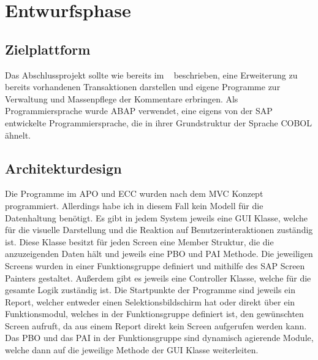 \section{Entwurfsphase} 
\label{sec:Entwurfsphase}

\subsection{Zielplattform}
\label{sec:Zielplattform}
Das Abschlussprojekt sollte wie bereits im ~ beschrieben, eine Erweiterung zu bereits vorhandenen Transaktionen darstellen und eigene Programme zur Verwaltung und Massenpflege der Kommentare erbringen. Als Programmiersprache wurde \ac{ABAP} verwendet, eine eigens von der SAP entwickelte Programmiersprache, die in ihrer Grundstruktur der Sprache COBOL ähnelt.

\subsection{Architekturdesign}
\label{sec:Architekturdesign}
Die Programme im \ac{APO} und \ac{ECC} wurden nach dem \ac{MVC} Konzept programmiert. Allerdings habe ich in diesem Fall kein Modell für die Datenhaltung benötigt. Es gibt in jedem System jeweils eine \ac{GUI} Klasse, welche für die visuelle Darstellung und die Reaktion auf Benutzerinteraktionen zuständig ist. Diese Klasse besitzt für jeden Screen eine Member Struktur, die die anzuzeigenden Daten hält und jeweils eine \ac{PBO} und \ac{PAI} Methode. Die jeweiligen Screens wurden in einer Funktionsgruppe definiert und mithilfe des SAP Screen Painters gestaltet. Außerdem gibt es jeweils eine Controller Klasse, welche für die gesamte Logik zuständig ist. Die Startpunkte der Programme sind jeweils ein Report, welcher entweder einen Selektionsbildschirm hat oder direkt über ein Funktionsmodul, welches in der Funktionsgruppe definiert ist, den gewünschten Screen aufruft, da aus einem Report direkt kein Screen aufgerufen werden kann. Das \ac{PBO} und das \ac{PAI} in der Funktionsgruppe sind dynamisch agierende Module, welche dann auf die jeweilige Methode der \ac{GUI} Klasse weiterleiten.

